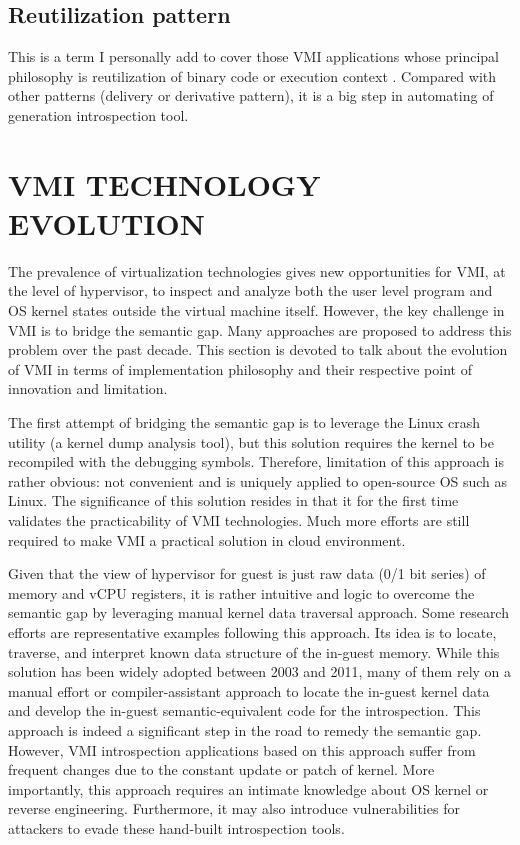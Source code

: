 \subsection{Reutilization pattern}

This is a term I personally add to cover those VMI applications whose principal philosophy is reutilization of binary code or execution context 
\cite{Reference7, Reference28}. Compared with other patterns (delivery or derivative pattern), it is a big step in automating of generation 
introspection tool.


\section{VMI TECHNOLOGY EVOLUTION}

The prevalence of virtualization technologies gives new opportunities for VMI, at the level of hypervisor, to inspect and analyze both the user 
level program and OS kernel states outside the virtual machine itself. However, the key challenge in VMI is to bridge the semantic gap. Many 
approaches are proposed to address this problem over the past decade. This section is devoted to talk about the evolution of VMI in terms of 
implementation philosophy and their respective point of innovation and limitation.

The first attempt \cite{Reference1} of bridging the semantic gap is to leverage the Linux crash utility (a kernel dump analysis tool), but this 
solution requires the kernel to be recompiled with the debugging symbols. Therefore, limitation of this approach is rather obvious: not convenient
and is uniquely applied to open-source OS such as Linux. The significance of this solution resides in that it for the first time validates the 
practicability of VMI technologies. Much more efforts are still required to make VMI a practical solution in cloud environment.

Given that the view of hypervisor for guest is just raw data (0/1 bit series) of memory and vCPU registers, it is rather intuitive and logic to 
overcome the semantic gap by leveraging manual kernel data traversal approach. Some research efforts \cite{Reference2} are representative examples
following this approach. Its idea is to locate, traverse, and interpret known data structure of the in-guest memory. While this solution has 
been widely adopted between 2003 and 2011, many of them rely on a manual effort or compiler-assistant approach to locate the in-guest kernel 
data and develop the in-guest semantic-equivalent code for the introspection. This approach is indeed a significant step in the road to remedy 
the semantic gap. However, VMI introspection applications based on this approach suffer from frequent changes due to the constant update or 
patch of kernel. More importantly, this approach requires an intimate knowledge about OS kernel or reverse engineering. Furthermore, it may also
introduce vulnerabilities for attackers to evade these hand-built introspection tools.

